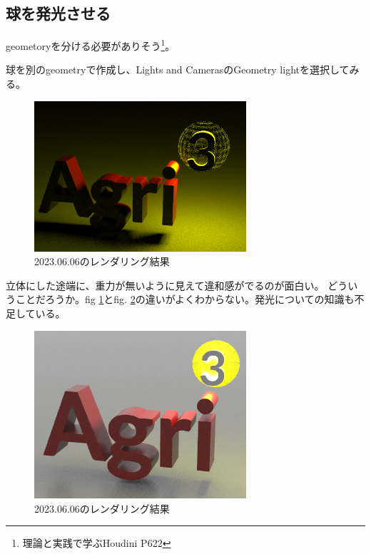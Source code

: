\documentclass[uplatex,dvipdfmx]{jsarticle}
\begin{document}
\subsection{球を発光させる}
geometoryを分ける必要がありそう\footnote{理論と実践で学ぶHoudini P622}。

球を別のgeometryで作成し、Lights and CamerasのGeometry lightを選択してみる。

\begin{figure}[h]
  \centering
  \includegraphics[width=0.7\textwidth]{figs/fig_light_3.PNG}
  \caption{2023.06.06のレンダリング結果}
  \label{fig:rendered_230606_2}
\end{figure}


立体にした途端に、重力が無いように見えて違和感がでるのが面白い。
どういうことだろうか。fig \ref{fig:rendered_230606_2}とfig. \ref{fig:rendered_230606_3}の違いがよくわからない。発光についての知識も不足している。

\begin{figure}[h]
  \centering
  \includegraphics[width=0.7\textwidth]{figs/fig_light_4.PNG}
  \caption{2023.06.06のレンダリング結果}
  \label{fig:rendered_230606_3}
\end{figure}
\end{document}
